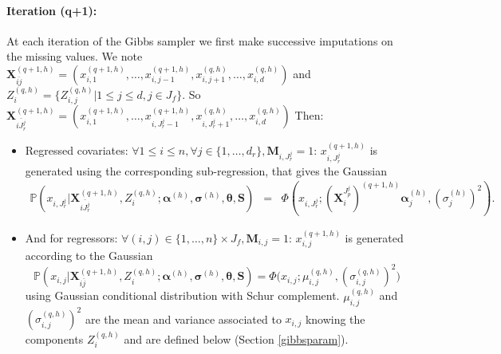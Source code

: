 \documentclass[12pt,a4paper]{report}
\begin{document}
		\paragraph{Iteration (q+1):} At each iteration of the Gibbs sampler we first make successive imputations on the missing values. We note $\boldsymbol{X}^{(q+1,h)}_{\bar{ij}}=(x_{i,1}^{(q+1,h)},\dots, x^{(q+1,h)}_{i,j-1},x_{i,j+1}^{(q,h)},\dots, x_{i,d}^{(q,h)})$ and $Z_{i}^{(q,h)}=\{Z_{i,j}^{(q,h)}|1\leq j \leq d, j\in J_f \}$. So $\boldsymbol{X}^{(q+1,h)}_{\bar{iJ_r^j}}=(x_{i,1}^{(q+1,h)},\dots, x^{(q+1,h)}_{i,J_r^j-1},x_{i,J_r^j+1}^{(q,h)},\dots, x_{i,d}^{(q,h)})$  Then: 
		\begin{itemize}
			\item Regressed covariates: $\forall 1\leq i \leq n, \forall j \in \{1,\dots,d_r \}, \boldsymbol{M}_{i,J_r^j}=1  $:  $x_{i,J_r^j}^{(q+1,h)}$ is generated using the corresponding sub-regression, that gives the Gaussian
			\begin{eqnarray}
			\mathbb{P}(x_{i,J_r^j}|\boldsymbol{X}^{(q+1,h)}_{\bar{iJ_r^j}},Z_i^{(q,h)};\boldsymbol{\alpha}^{(h)},\boldsymbol{\sigma}^{(h)},\boldsymbol{\theta},\boldsymbol{S})%
			&=&\Phi(x_{i,J_r^j};(\boldsymbol{X}_i^{J_p^j})^{(q+1,h)}\boldsymbol{\alpha}^{(h)}_{j},(\sigma_j^{(h)})^2 ). \nonumber
			\end{eqnarray}		
			\item And for regressors:
			$\forall (i,j) \in \{1,\dots,n \}\times J_f,\boldsymbol{M}_{i,j}=1$:  $x_{i,j}^{(q+1,h)}$ is generated according to the Gaussian 
			$$\mathbb{P}(x_{i,j}|\boldsymbol{X}_{i\bar{j}}^{(q+1,h)},Z_i^{(q,h)};\boldsymbol{\alpha}^{(h)},\boldsymbol{\sigma}^{(h)},\boldsymbol{\theta},\boldsymbol{S})=\Phi \big(x_{i,j}; \mu_{i,j}^{(q,h)}, (\sigma_{i,j}^{(q,h)})^2\big)$$ 
			using Gaussian conditional distribution with Schur complement. $\mu_{i,j}^{(q,h)}$ and $(\sigma_{i,j}^{(q,h)})^2$  are the mean and variance associated to $x_{i,j}$ knowing the components $Z_i^{(q,h)}$ and are defined below (Section \ref{gibbsparam}).
			\end{itemize}
				
\end{document}
